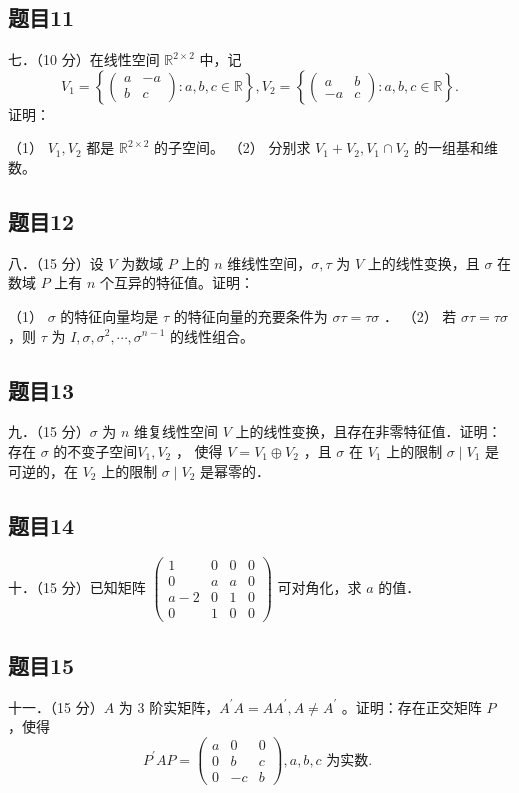 \documentclass{article}
\begin{document}
\subsection{题目11}
七．（10 分）在线性空间 \(\mathbb{R}^{2 \times 2}\) 中，记
\[
V_{1}=\left\{\left(\begin{array}{cc}
a & -a \\
b & c
\end{array}\right): a, b, c \in \mathbb{R}\right\}, V_{2}=\left\{\left(\begin{array}{cc}
a & b \\
-a & c
\end{array}\right): a, b, c \in \mathbb{R}\right\} .
\]
证明：

（1） \(V_{1}, V_{2}\) 都是 \(\mathbb{R}^{2 \times 2}\) 的子空间。
（2） 分别求 \(V_{1}+V_{2}, V_{1} \cap V_{2}\) 的一组基和维数。

\subsection{题目12}
八．（15 分）设 \(V\) 为数域 \(P\) 上的 \(n\) 维线性空间，\(\sigma, \tau\) 为 \(V\) 上的线性变换，且 \(\sigma\) 在数域 \(P\) 上有 \(n\) 个互异的特征值。证明：

（1） \(\sigma\) 的特征向量均是 \(\tau\) 的特征向量的充要条件为 \(\sigma \tau=\tau \sigma\) ．
（2） 若 \(\sigma \tau=\tau \sigma\) ，则 \(\tau\) 为 \(I, \sigma, \sigma^{2}, \cdots, \sigma^{n-1}\) 的线性组合。

\subsection{题目13}
九．（15 分）\(\sigma\) 为 \(n\) 维复线性空间 \(V\) 上的线性变换，且存在非零特征值．证明：存在 \(\sigma\) 的不变子空间\(V_{1}, V_{2}\) ，
使得 \(V=V_{1} \oplus V_{2}\) ，且 \(\sigma\) 在 \(V_{1}\) 上的限制 \(\sigma \mid V_{1}\) 是可逆的，在 \(V_{2}\) 上的限制 \(\sigma \mid V_{2}\) 是幂零的．

\subsection{题目14}
十．（15 分）已知矩阵 \(\left(\begin{array}{rrrr}1 & 0 & 0 & 0 \\ 0 & a & a & 0 \\ a-2 & 0 & 1 & 0 \\ 0 & 1 & 0 & 0\end{array}\right)\) 可对角化，求 \(a\) 的值．

\subsection{题目15}
十一．（15 分）\(A\) 为 3 阶实矩阵，\(A^{\prime} A=A A^{\prime}, A \neq A^{\prime}\) 。证明：存在正交矩阵 \(P\) ，使得
\[
P^{\prime} A P=\left(\begin{array}{ccc}
a & 0 & 0 \\
0 & b & c \\
0 & -c & b
\end{array}\right), a, b, c \text { 为实数. }
\]
\end{document}
